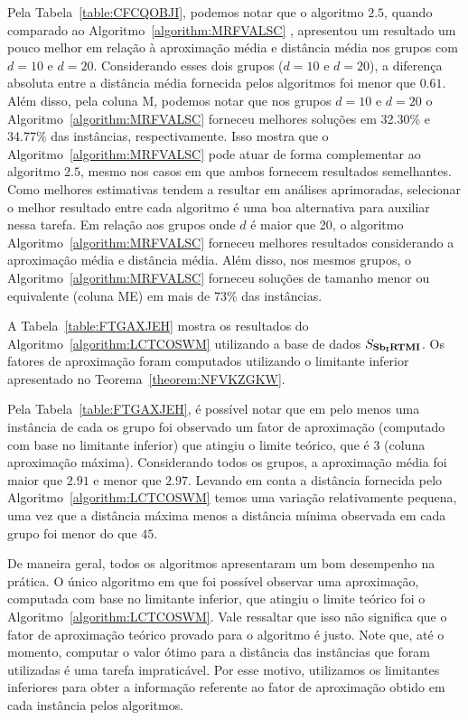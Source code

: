 

Pela Tabela~\ref{table:CFCQOBJI}, podemos notar que o algoritmo $2.5$\SbIRTM{}, quando comparado ao Algoritmo~\ref{algorithm:MRFVALSC} , apresentou um resultado um pouco melhor em relação à aproximação média e distância média nos grupos com $d =10$ e $d=20$. Considerando esses dois grupos ($d=10$ e $d=20$), a diferença absoluta entre a distância média fornecida pelos algoritmos foi menor que $0.61$. Além disso, pela coluna M, podemos notar que nos grupos $d=10$ e $d=20$ o Algoritmo~\ref{algorithm:MRFVALSC} forneceu melhores soluções em 32.30\% e 34.77\% das instâncias, respectivamente. Isso mostra que o Algoritmo~\ref{algorithm:MRFVALSC} pode atuar de forma complementar ao algoritmo $2.5$\SbIRTM{}, mesmo nos casos em que ambos fornecem resultados semelhantes. Como melhores estimativas tendem a resultar em análises aprimoradas, selecionar o melhor resultado entre cada algoritmo é uma boa alternativa para auxiliar nessa tarefa. Em relação aos grupos onde $d$ é maior que 20, o algoritmo Algoritmo~\ref{algorithm:MRFVALSC} forneceu melhores resultados considerando a aproximação média e distância média. Além disso, nos mesmos grupos, o Algoritmo~\ref{algorithm:MRFVALSC} forneceu soluções de tamanho menor ou equivalente (coluna ME) em mais de 73\% das instâncias.

A Tabela~\ref{table:FTGAXJEH} mostra os resultados do Algoritmo~\ref{algorithm:LCTCOSWM} utilizando a base de dados $S_{\textbf{Sb\textsubscript{I}RTMI}}{}$. Os fatores de aproximação foram computados utilizando o limitante inferior apresentado no Teorema~\ref{theorem:NFVKZGKW}.



Pela Tabela~\ref{table:FTGAXJEH}, é possível notar que em pelo menos uma instância de cada os grupo foi observado um fator de aproximação (computado com base no limitante inferior) que atingiu o limite teórico, que é $3$ (coluna aproximação máxima). Considerando todos os grupos, a aproximação média foi maior que $2.91$ e menor que $2.97$. Levando em conta a distância fornecida pelo Algoritmo~\ref{algorithm:LCTCOSWM} temos uma variação relativamente pequena, uma vez que a distância máxima menos a distância mínima observada em cada grupo foi menor do que $45$.

De maneira geral, todos os algoritmos apresentaram um bom desempenho na prática. O único algoritmo em que foi possível observar uma aproximação, computada com base no limitante inferior, que atingiu o limite teórico foi o Algoritmo~\ref{algorithm:LCTCOSWM}. Vale ressaltar que isso não significa que o fator de aproximação teórico provado para o algoritmo é justo. Note que, até o momento, computar o valor ótimo para a distância das instâncias que foram utilizadas é uma tarefa impraticável. Por esse motivo, utilizamos os limitantes inferiores para obter a informação referente ao fator de aproximação obtido em cada instância pelos algoritmos.


